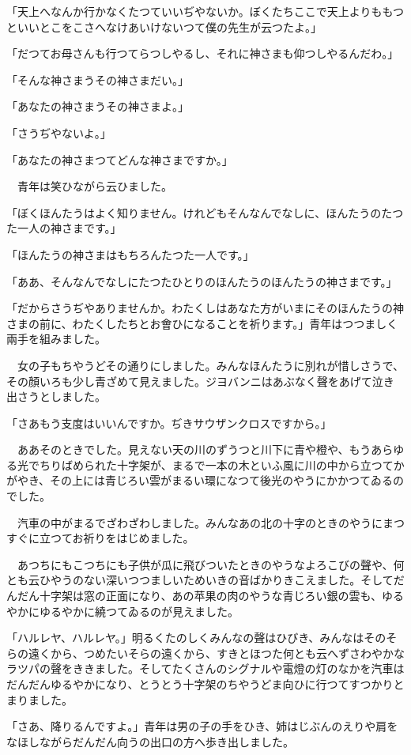 \documentclass[tate,paper=b6j,jafontsize=9pt]{jlreq}
\begin{document}
「天上へなんか行かなくたつていいぢやないか。ぼくたちここで天上よりももつといいとこをこさへなけあいけないつて僕の先生が云つたよ。」

「だつてお母さんも行つてらつしやるし、それに神さまも仰つしやるんだわ。」

「そんな神さまうその神さまだい。」

「あなたの神さまうその神さまよ。」

「さうぢやないよ。」

「あなたの神さまつてどんな神さまですか。」

　青年は笑ひながら云ひました。

「ぼくほんたうはよく知りません。けれどもそんなんでなしに、ほんたうのたつた一人の神さまです。」

「ほんたうの神さまはもちろんたつた一人です。」

「ああ、そんなんでなしにたつたひとりのほんたうのほんたうの神さまです。」

「だからさうぢやありませんか。わたくしはあなた方がいまにそのほんたうの神さまの前に、わたくしたちとお會ひになることを祈ります。」青年はつつましく兩手を組みました。

　女の子もちやうどその通りにしました。みんなほんたうに別れが惜しさうで、その顏いろも少し青ざめて見えました。ジヨバンニはあぶなく聲をあげて泣き出さうとしました。

「さあもう支度はいいんですか。ぢきサウザンクロスですから。」

　ああそのときでした。見えない天の川のずうつと川下に青や橙や、もうあらゆる光でちりばめられた十字架が、まるで一本の木といふ風に川の中から立つてかがやき、その上には青じろい雲がまるい環になつて後光のやうにかかつてゐるのでした。

　汽車の中がまるでざわざわしました。みんなあの北の十字のときのやうにまつすぐに立つてお祈りをはじめました。

　あつちにもこつちにも子供が瓜に飛びついたときのやうなよろこびの聲や、何とも云ひやうのない深いつつましいためいきの音ばかりきこえました。そしてだんだん十字架は窓の正面になり、あの苹果の肉のやうな青じろい銀の雲も、ゆるやかにゆるやかに繞つてゐるのが見えました。

「ハルレヤ、ハルレヤ。」明るくたのしくみんなの聲はひびき、みんなはそのそらの遠くから、つめたいそらの遠くから、すきとほつた何とも云へずさわやかなラツパの聲をききました。そしてたくさんのシグナルや電燈の灯のなかを汽車はだんだんゆるやかになり、とうとう十字架のちやうどま向ひに行つてすつかりとまりました。

「さあ、降りるんですよ。」青年は男の子の手をひき、姉はじぶんのえりや肩をなほしながらだんだん向うの出口の方へ歩き出しました。
\end{document}
